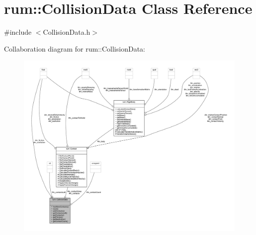 \hypertarget{classrum_1_1_collision_data}{}\section{rum\+:\+:Collision\+Data Class Reference}
\label{classrum_1_1_collision_data}


{\ttfamily \#include $<$Collision\+Data.\+h$>$}



Collaboration diagram for rum\+:\+:Collision\+Data\+:\nopagebreak
\begin{figure}[H]
\begin{center}
\leavevmode
\includegraphics[width=350pt]{classrum_1_1_collision_data__coll__graph}
\end{center}
\end{figure}
